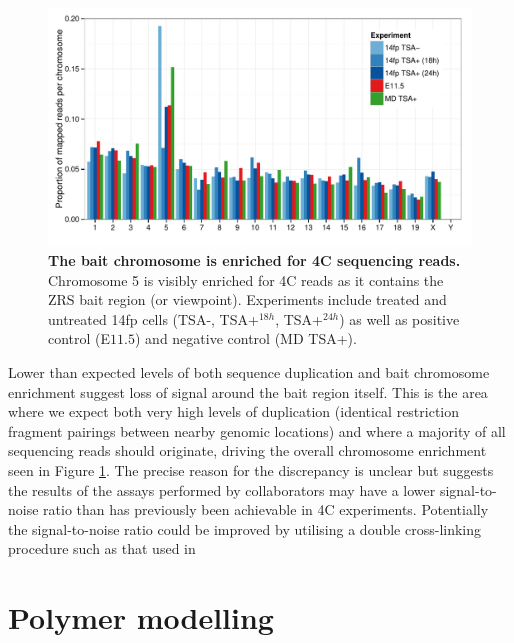 \documentclass[a4paper,11pt,oneside]{book}
\begin{document}
\begin{figure}
\begin{center} 
\includegraphics[width=5.4in]{4c_chromosomes_v2.pdf}
\captionsetup{width=\textwidth} 
\caption[ The bait chromosome is enriched for 4C sequencing reads. ]{ {\bf The bait chromosome is enriched for 4C sequencing reads. }
Chromosome 5 is visibly enriched for 4C reads as it  contains the ZRS bait region (or viewpoint). Experiments include treated and untreated 14fp cells (TSA-, TSA+$^{18h}$, TSA+$^{24h}$) as well as positive control (E$11.5$) and negative control (MD TSA+).
}\label{fig:4cchromosomes}
\end{center} 
\end{figure} 

Lower than expected levels of both sequence duplication and bait chromosome enrichment suggest loss of signal around the bait region itself. This is the area where we expect both very high levels of duplication (identical restriction fragment pairings between nearby genomic locations) and where a majority of all sequencing reads should originate, driving the overall chromosome enrichment seen in Figure \ref{fig:4cchromosomes}. The precise reason for the discrepancy is unclear but suggests the results of the assays performed by collaborators may have a lower signal-to-noise ratio than has previously been achievable in 4C experiments.\cite{Stadhouders2013} Potentially the signal-to-noise ratio could be improved by utilising a double cross-linking procedure such as that used in \citet{Lin2012}

\section{Polymer modelling}
\end{document}

